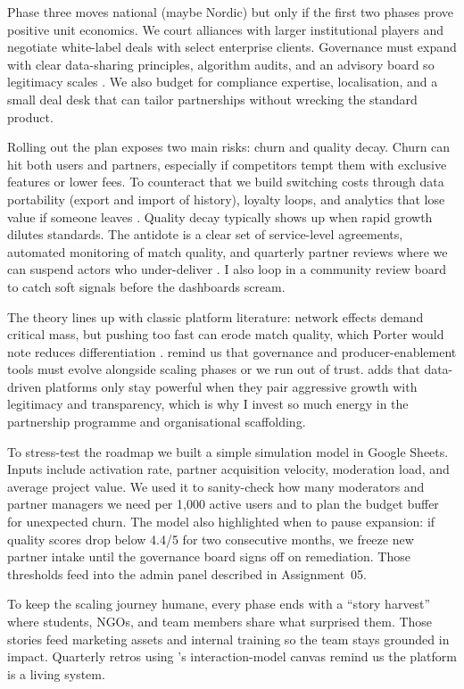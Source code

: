 Phase three moves national (maybe Nordic) but only if the first two phases prove positive unit economics. We court alliances with larger institutional players and negotiate white-label deals with select enterprise clients. Governance must expand with clear data-sharing principles, algorithm audits, and an advisory board so legitimacy scales \citep{Srnicek2017,Zuboff2019}. We also budget for compliance expertise, localisation, and a small deal desk that can tailor partnerships without wrecking the standard product.

Rolling out the plan exposes two main risks: churn and quality decay. Churn can hit both users and partners, especially if competitors tempt them with exclusive features or lower fees. To counteract that we build switching costs through data portability (export and import of history), loyalty loops, and analytics that lose value if someone leaves \citep{FarrellSaloner1986,ShapiroVarian1999}. Quality decay typically shows up when rapid growth dilutes standards. The antidote is a clear set of service-level agreements, automated monitoring of match quality, and quarterly partner reviews where we can suspend actors who under-deliver \citep{Reillier2017}. I also loop in a community review board to catch soft signals before the dashboards scream.

The theory lines up with classic platform literature: network effects demand critical mass, but pushing too fast can erode match quality, which Porter would note reduces differentiation \citep{Porter2008}. \citet{Choudary2016} remind us that governance and producer-enablement tools must evolve alongside scaling phases or we run out of trust. \citet{Srnicek2017} adds that data-driven platforms only stay powerful when they pair aggressive growth with legitimacy and transparency, which is why I invest so much energy in the partnership programme and organisational scaffolding.

To stress-test the roadmap we built a simple simulation model in Google Sheets. Inputs include activation rate, partner acquisition velocity, moderation load, and average project value. We used it to sanity-check how many moderators and partner managers we need per 1,000 active users and to plan the budget buffer for unexpected churn. The model also highlighted when to pause expansion: if quality scores drop below 4.4/5 for two consecutive months, we freeze new partner intake until the governance board signs off on remediation. Those thresholds feed into the admin panel described in Assignment~05.

To keep the scaling journey humane, every phase ends with a ``story harvest'' where students, NGOs, and team members share what surprised them. Those stories feed marketing assets and internal training so the team stays grounded in impact. Quarterly retros using \citet{Choudary2016}'s interaction-model canvas remind us the platform is a living system.
